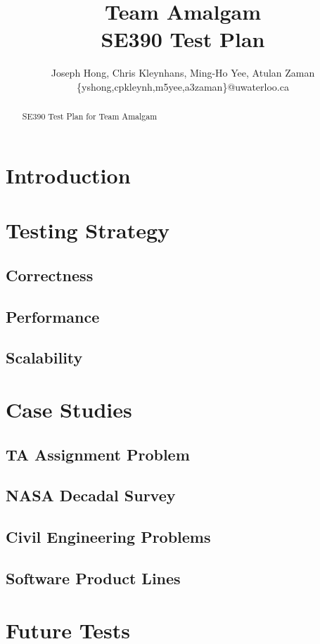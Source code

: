 \documentclass[11pt]{article}
\title{{\Large Team Amalgam} \\ SE390 Test Plan}
\author{Joseph Hong, Chris Kleynhans, Ming-Ho Yee, Atulan Zaman \\
        \{yshong,cpkleynh,m5yee,a3zaman\}@uwaterloo.ca}
\begin{document}
\maketitle

\begin{abstract}
SE390 Test Plan for Team Amalgam
\end{abstract}

\tableofcontents
\newpage

\section{Introduction}

\section{Testing Strategy}

\subsection{Correctness}

\subsection{Performance}

\subsection{Scalability}

\section{Case Studies}

\subsection{TA Assignment Problem}

\subsection{NASA Decadal Survey}

\subsection{Civil Engineering Problems}

\subsection{Software Product Lines}

\section{Future Tests}

\printbibliography[heading=bibintoc]
\end{document}
